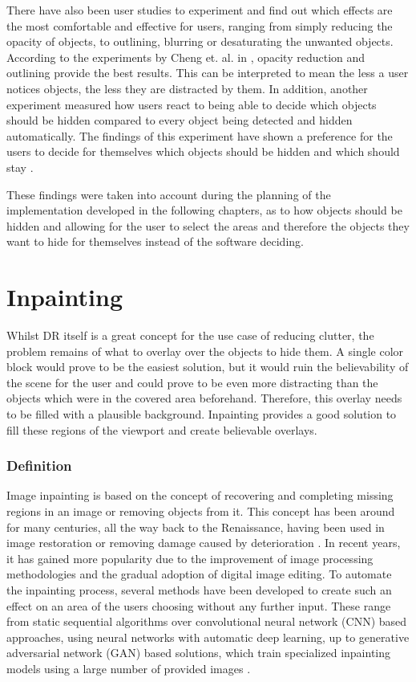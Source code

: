 There have also been user studies to experiment and find out which effects are the most comfortable and effective for users, ranging from simply reducing the opacity of objects, to outlining, blurring or desaturating the unwanted objects. According to the experiments by Cheng et. al. in \cite{ChengYiFei2022TUDR}, opacity reduction and outlining provide the best results.
This can be interpreted to mean the less a user notices objects, the less they are distracted by them.
In addition, another experiment measured how users react to being able to decide which objects should be hidden compared to every object being detected and hidden automatically. The findings of this experiment have shown a preference for the users to decide for themselves which objects should be hidden and which should stay \cite{ChengYiFei2022TUDR}.

These findings were taken into account during the planning of the implementation developed in the following chapters, as to how objects should be hidden and allowing for the user to select the areas and therefore the objects they want to hide for themselves instead of the software deciding.

\section{Inpainting}
\label{cha:Inpainting}

Whilst DR itself is a great concept for the use case of reducing clutter, the problem remains of what to overlay over the objects to hide them. A single color block would prove to be the easiest solution, but it would ruin the believability of the scene for the user and could prove to be even more distracting than the objects which were in the covered area beforehand.
Therefore, this overlay needs to be filled with a plausible background. Inpainting provides a good solution to fill these regions of the viewport and create believable overlays.

\subsubsection{Definition}
Image inpainting is based on the concept of recovering and completing missing regions in an image or removing objects from it. This concept has been around for many centuries, all the way back to the Renaissance, having been used in image restoration or removing damage caused by deterioration \cite{gillette2006image}.
In recent years, it has gained more popularity due to the improvement of image processing methodologies and the gradual adoption of digital image editing. To automate the inpainting process, several methods have been developed to create such an effect on an area of the users choosing without any further input. These range from 
static sequential algorithms over convolutional neural network (CNN) based approaches, using neural networks with automatic deep learning, up to generative adversarial network (GAN) based solutions, which train specialized inpainting models using a large number of provided images \cite{ElharroussOmar2020IIAR}.


